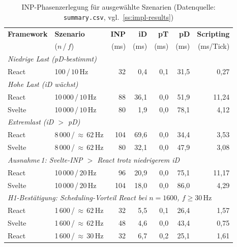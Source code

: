 \begin{table}[H]
  \centering
  \caption[INP-Phasenzerlegung für ausgewählte Szenarien]{INP-Phasenzerlegung für ausgewählte Szenarien (Datenquelle:
           \texttt{summary.csv}, vgl.~\cref{ss:impl-results})}
  \label{tab:inp-phases}
  \small
  \begin{tabular}{llrrrrr}
    \toprule
    \textbf{Framework} & \textbf{Szenario}
      & \textbf{INP} & \textbf{iD} & \textbf{pT} & \textbf{pD}
      & \textbf{Scripting} \\
    & ($n$\,/\,$f$)
      & (ms) & (ms) & (ms) & (ms)
      & (ms/Tick) \\
    \midrule
    \multicolumn{7}{l}{\textit{Niedrige Last (pD-bestimmt)}} \\
    React  & 100\,/\,$10\,\text{Hz}$
      & 32  & 0{,}4  & 0{,}1 & 31{,}5 & 0{,}27 \\
    \midrule
    \multicolumn{7}{l}{\textit{Hohe Last (iD wächst)}} \\
    React  & 10\,000\,/\,$10\,\text{Hz}$
      & 88  & 36{,}1 & 0{,}0 & 51{,}9 & 11{,}24 \\
    Svelte & 10\,000\,/\,$10\,\text{Hz}$
      & 80  & 1{,}9  & 0{,}0 & 78{,}1 & 4{,}12 \\
    \midrule
    \multicolumn{7}{l}{\textit{Extremlast (iD $>$ pD)}} \\
    React  & 8\,000\,/\,${\approx}\,62\,\text{Hz}$
      & 104 & 69{,}6 & 0{,}0 & 34{,}4 & 3{,}53 \\
    Svelte & 8\,000\,/\,${\approx}\,62\,\text{Hz}$
      & 80  & 32{,}1 & 0{,}0 & 47{,}9 & 3{,}08 \\
    \midrule
    \multicolumn{7}{l}{\textit{Ausnahme\,1: Svelte-INP $>$ React trotz niedrigerem iD}} \\
    React  & 10\,000\,/\,$20\,\text{Hz}$
      & 96  & 20{,}9 & 0{,}0 & 75{,}1 & 11{,}17 \\
    Svelte & 10\,000\,/\,$20\,\text{Hz}$
      & 104 & 18{,}0 & 0{,}0 & 86{,}0 & 4{,}29 \\
    \midrule
    \multicolumn{7}{l}{\textit{H1-Bestätigung: Scheduling-Vorteil React bei $n = 1600$, $f \geq 30\,\text{Hz}$}} \\
    React  & 1\,600\,/\,${\approx}\,62\,\text{Hz}$
      & 32  & 5{,}5  & 0{,}1 & 26{,}4 & 1{,}57 \\
    Svelte & 1\,600\,/\,${\approx}\,62\,\text{Hz}$
      & 48  & 4{,}6  & 0{,}0 & 43{,}4 & 0{,}75 \\
    React  & 1\,600\,/\,${\approx}\,30\,\text{Hz}$
      & 32  & 6{,}7  & 0{,}2 & 25{,}1 & 1{,}61 \\

\end{tabular}
\end{table}
